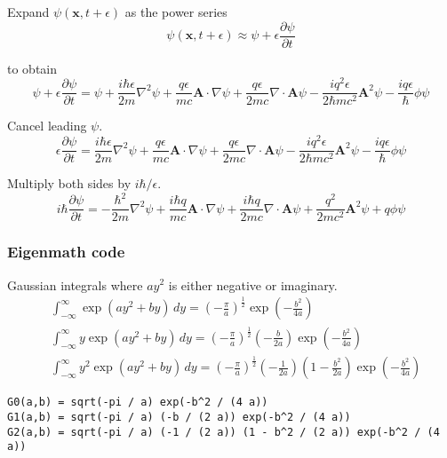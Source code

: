 Expand $\psi(\mathbf x,t+\epsilon)$ as the power series
\begin{equation*}
\psi(\mathbf x,t+\epsilon)\approx\psi+\epsilon\frac{\partial\psi}{\partial t}
\end{equation*}

to obtain
\begin{equation*}
\psi+\epsilon\frac{\partial\psi}{\partial t}
=\psi
+\frac{i\hbar\epsilon}{2m}\nabla^2\psi
+\frac{q\epsilon}{mc}\mathbf A\cdot\nabla\psi
+\frac{q\epsilon}{2mc}\nabla\cdot\mathbf A\psi
-\frac{iq^2\epsilon}{2\hbar mc^2}\mathbf A^2\psi
-\frac{iq\epsilon}{\hbar}\phi\psi
\end{equation*}

Cancel leading $\psi$.
\begin{equation*}
\epsilon\frac{\partial\psi}{\partial t}
=\frac{i\hbar\epsilon}{2m}\nabla^2\psi
+\frac{q\epsilon}{mc}\mathbf A\cdot\nabla\psi
+\frac{q\epsilon}{2mc}\nabla\cdot\mathbf A\psi
-\frac{iq^2\epsilon}{2\hbar mc^2}\mathbf A^2\psi
-\frac{iq\epsilon}{\hbar}\phi\psi
\end{equation*}

Multiply both sides by $i\hbar/\epsilon$.
\begin{equation*}
i\hbar\frac{\partial\psi}{\partial t}
=-\frac{\hbar^2}{2m}\nabla^2\psi
+\frac{i\hbar q}{mc}\mathbf A\cdot\nabla\psi
+\frac{i\hbar q}{2mc}\nabla\cdot\mathbf A\psi
+\frac{q^2}{2mc^2}\mathbf A^2\psi
+q\phi\psi
\end{equation*}

\subsubsection*{Eigenmath code}

Gaussian integrals where $ay^2$ is either negative or imaginary.
\begin{align*}
&\int_{-\infty}^\infty\exp(ay^2+by)\,dy
=\left(-\frac{\pi}{a}\right)^\frac{1}{2}
\exp\left(-\frac{b^2}{4a}\right)
\\
&\int_{-\infty}^\infty y\exp(ay^2+by)\,dy
=\left(-\frac{\pi}{a}\right)^\frac{1}{2}
\left(-\frac{b}{2a}\right)
\exp\left(-\frac{b^2}{4a}\right)
\\
&\int_{-\infty}^\infty y^2\exp(ay^2+by)\,dy
=\left(-\frac{\pi}{a}\right)^\frac{1}{2}
\left(-\frac{1}{2a}\right)
\left(1-\frac{b^2}{2a}\right)
\exp\left(-\frac{b^2}{4a}\right)
\end{align*}

{\footnotesize\begin{verbatim}
G0(a,b) = sqrt(-pi / a) exp(-b^2 / (4 a))
G1(a,b) = sqrt(-pi / a) (-b / (2 a)) exp(-b^2 / (4 a))
G2(a,b) = sqrt(-pi / a) (-1 / (2 a)) (1 - b^2 / (2 a)) exp(-b^2 / (4 a))
\end{verbatim}}

